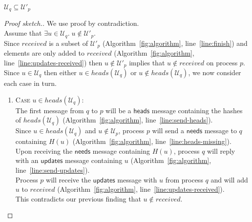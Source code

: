 \documentclass[a4paper,anonymous,USenglish]{lipics-v2019}
\begin{document}
\begin{lemma}\label{lemma:no-q-missing}
$\mathcal{U}_q \subseteq \mathcal{U}'_p$
\end{lemma}
\begin{proof}[Proof sketch.]
We use proof by contradiction.\\
Assume that $\exists u \in \mathcal{U}_q.\; u \notin  \mathcal{U}'_p$.\\
Since $\mathit{received}$ is a subset of $\mathcal{U}'_p$ (Algorithm~\ref{fig:algorithm}, line~\ref{line:finish}) and elements are only added to $\mathit{received}$ (Algorithm~\ref{fig:algorithm}, line~\ref{line:updates-received}) then $u \notin  \mathcal{U}'_p$ implies that $u \notin \mathit{received}$ on process $p$.\\
Since $u \in \mathcal{U}_q$ then either $u \in \mathit{heads}(\mathcal{U}_q)$ or $u \notin \mathit{heads}(\mathcal{U}_q)$, we now consider each case in turn.
\begin{enumerate}
    \item\textsc{Case} $u \in heads(\mathcal{U}_q)$:\\
    The first message from $q$ to $p$ will be a $\mathsf{heads}$ message containing the hashes of $\mathit{heads}(\mathcal{U}_q)$ (Algorithm~\ref{fig:algorithm}, line~\ref{line:send-heads}).\\
    Since $u \in heads(\mathcal{U}_q)$ and $u \notin  \mathcal{U}_p$, process $p$ will send a $\mathsf{needs}$ message to $q$ containing $H(u)$ (Algorithm~\ref{fig:algorithm}, line~\ref{line:heads-missing}).\\
    Upon receiving the $\mathsf{needs}$ message containing $H(u)$, process $q$ will reply with an $\mathsf{updates}$ message containing $u$ (Algorithm~\ref{fig:algorithm}, line~\ref{line:send-updates}).\\
    Process $p$ will receive the $\mathsf{updates}$ message with $u$ from process $q$ and will add $u$ to $\mathit{received}$ (Algorithm~\ref{fig:algorithm}, line~\ref{line:updates-received}).\\
    This contradicts our previous finding that $u \notin \mathit{received}$.
    

\end{enumerate}
\end{proof}
\end{document}
